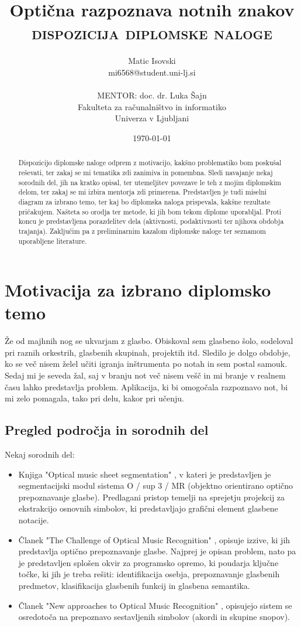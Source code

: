 \documentclass[11pt,a4paper]{article}
\title{Optična razpoznava notnih znakov\\
\textsc{dispozicija diplomske naloge}}
\author{Matic Isovski\\
mi6568@student.uni-lj.si\\
\ \\
MENTOR: doc. dr. Luka Šajn \\
Fakulteta za računalništvo in informatiko\\ 
Univerza v Ljubljani
\date{\today}         
}
\begin{document}
\maketitle

\begin{abstract}
Dispozicijo diplomske naloge odprem z motivacijo, kakšno problematiko bom poskušal reševati, ter zakaj se mi tematika zdi zanimiva in pomembna. Sledi navajanje nekaj sorodnih del, jih na kratko opisal, ter utemeljitev povezave le teh z mojim diplomskim delom, ter zakaj se mi izbira mentorja zdi primerena. Predstavljen je tudi miselni diagram za izbrano temo, ter kaj bo diplomska naloga prispevala, kakšne rezultate pričakujem. Našteta so orodja ter metode, ki jih bom tekom diplome uporabljal. Proti koncu je predstavljena porazdelitev dela (aktivnosti, podaktivnosti ter njihova obdobja trajanja). Zaključim pa z preliminarnim kazalom diplomske naloge ter seznamom uporabljene literature.
\end{abstract}


\section{Motivacija za izbrano diplomsko temo}

Že od majhnih nog se ukvarjam z glasbo. Obiskoval sem glasbeno šolo, sodeloval pri raznih orkestrih, glasbenih skupinah, projektih itd. Sledilo je dolgo obdobje, ko se več nisem želel učiti igranja inštrumenta po notah in sem postal samouk. Sedaj mi je seveda žal, saj v branju not več nisem vešč in mi branje v realnem času lahko predstavlja problem. Aplikacija, ki bi omogočala razpoznavo not, bi mi zelo pomagala, tako pri delu, kakor pri učenju.

\subsection{Pregled področja in sorodnih del}

Nekaj sorodnih del:
\begin{itemize}
\item
Knjiga "Optical music sheet segmentation" \cite{omss}, v kateri je predstavljen je segmentacijski modul sistema O / sup 3 / MR (objektno orientirano optično prepoznavanje glasbe). Predlagani pristop temelji na sprejetju projekcij za ekstrakcijo osnovnih simbolov, ki predstavljajo grafični element glasbene notacije.
\item
Članek "The Challenge of Optical Music Recognition" \cite{tcomr}, opisuje izzive, ki jih predstavlja optično prepoznavanje glasbe. Najprej je opisan problem, nato pa je predstavljen splošen okvir za programsko opremo, ki poudarja ključne točke, ki jih je treba rešiti: identifikacija osebja, prepoznavanje glasbenih predmetov, klasifikacija glasbenih funkcij in glasbena semantika.
\item
Članek "New approaches to Optical Music Recognition" \cite{naomr}, opisujejo sistem se osredotoča na prepoznavo sestavljenih simbolov (akordi in skupine snopov).
\end{itemize}
\end{document}
